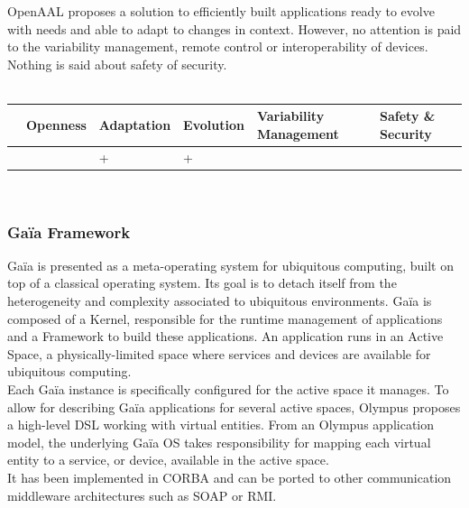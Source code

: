 OpenAAL proposes a solution to efficiently built applications ready to evolve with needs and able to adapt to changes in context. However, no attention is paid to the variability management, remote control or interoperability of devices. Nothing is said about safety of security.\\
 \\
\begin{tabular}{ >{\centering}m{}| >{\centering}m{} >{\centering}m{}| >{\centering}m{} >{\centering}m{}| >{\centering\arraybackslash}m{}}
{\tiny Interoperability} & {\tiny Openness} & {\tiny Adaptation} & {\tiny Evolution} & {\tiny Variability Management} & {\tiny Safety \& Security}\\
 \hline
  &  & + & + &  & \\ 
  \hline
\end{tabular}\\


\subsubsection{Ga\"ia Framework}
Ga\"ia\cite{Roman:2002} is presented as a meta-operating system for ubiquitous computing, built on top of a classical operating system. Its goal is to detach itself from the heterogeneity and complexity associated to ubiquitous environments. Ga\"ia is composed of a Kernel, responsible for the runtime management of applications and a Framework to build these applications. An application runs in an Active Space, a physically-limited space where services and devices are available for ubiquitous computing.\\
Each Ga\"ia instance is specifically configured for the active space it manages. To allow for describing Ga\"ia applications for several active spaces, Olympus\cite{Ranganathan:2005} proposes a high-level DSL working with virtual entities. From an Olympus application model, the underlying Ga\"ia OS takes responsibility for mapping each virtual entity to a service, or device, available in the active space.\\
It has been implemented in CORBA and can be ported to other communication middleware architectures such as SOAP or RMI.\\

